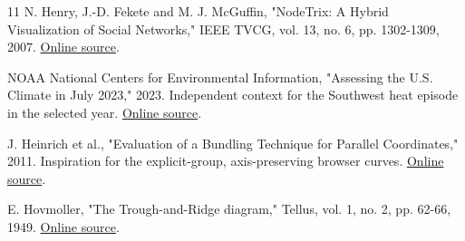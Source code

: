 \documentclass[conference,a4paper]{IEEEtran}
\begin{document}
\begin{thebibliography}{11}
 N. Henry, J.-D. Fekete and M. J. McGuffin, "NodeTrix: A Hybrid Visualization of Social Networks," IEEE TVCG, vol. 13, no. 6, pp. 1302-1309, 2007. \href{https://www.dgp.toronto.edu/~mjmcguff/research/nodetrix/nodetrix.pdf}{Online source}.

 NOAA National Centers for Environmental Information, "Assessing the U.S. Climate in July 2023," 2023. Independent context for the Southwest heat episode in the selected year. \href{https://www.ncei.noaa.gov/news/national-climate-202307}{Online source}.

 J. Heinrich et al., "Evaluation of a Bundling Technique for Parallel Coordinates," 2011. Inspiration for the explicit-group, axis-preserving browser curves. \href{https://arxiv.org/abs/1109.6073}{Online source}.

 E. Hovmoller, "The Trough-and-Ridge diagram," Tellus, vol. 1, no. 2, pp. 62-66, 1949. \href{https://doi.org/10.3402/tellusa.v1i2.8498}{Online source}.

\end{thebibliography}
\end{document}
